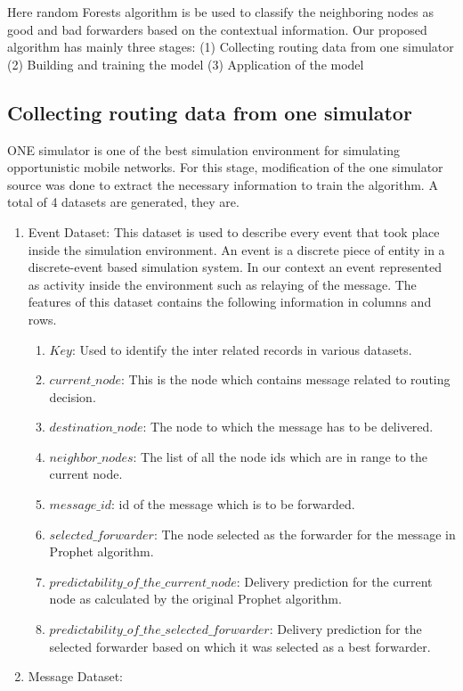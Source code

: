 \documentclass[10pt,journal]{IEEEtran}
\begin{document}
Here random Forests algorithm is be used to classify the neighboring nodes as good and bad forwarders based on the contextual information. Our proposed algorithm has mainly three stages: (1) Collecting routing data from one simulator (2) Building and training the model (3) Application of the model
\subsection{Collecting routing data from one simulator}
ONE simulator is one of the best simulation environment for  simulating opportunistic mobile networks. For this stage, modification of the one simulator source was done to extract the necessary information to train the algorithm. A total of 4 datasets are generated, they are.
\begin{enumerate}
	\item Event Dataset:
		This dataset is used to describe every event that took place inside the simulation environment. An event is a discrete piece of entity in a discrete-event based simulation system. In our context an event represented as activity inside the environment such as relaying of the message. The features of this dataset contains the following information in columns and rows.
		\begin{enumerate}
			\item $Key$: Used to identify the inter related records in various datasets. 
			\item $current\_node$: This is the node which contains message related to routing decision. 
			\item $destination\_node$: The node to which the message has to be delivered. 
			\item $neighbor\_nodes$: The list of all the node ids which are in range to the current node. 
			\item $message\_id$: id of the message which is to be forwarded. 
			\item $selected\_forwarder$: The node selected as the forwarder for the message in Prophet algorithm. 
			\item $predictability\_of\_the\_current\_node$: Delivery prediction for the current node as calculated by the original Prophet algorithm. 
			\item $predictability\_of\_the\_selected\_forwarder$: Delivery prediction for the selected forwarder based on which it was selected as a best forwarder.  
		\end{enumerate}
	\item Message Dataset:

\end{enumerate}
\end{document}
